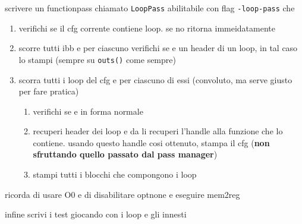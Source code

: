 scrivere un functionpass chiamato \lstinline|LoopPass| abilitabile con flag \lstinline|-loop-pass| che
\begin{enumerate}
  \item verifichi se il cfg corrente contiene loop. se no ritorna immeidatamente
  \item scorre tutti  ibb e per ciascuno verifichi se e un header di un loop, in tal caso lo stampi (sempre su \lstinline|outs()| come sempre)
  \item scorra tutti i loop del cfg e per ciascuno di essi (convoluto, ma serve giusto per fare pratica)
  \begin{enumerate}
    \item verifichi se e in forma normale
    \item recuperi header dei loop e da li recuperi l'handle alla funzione che lo contiene. usando questo handle cosi ottenuto, stampa il cfg (\textbf{non sfruttando quello passato dal pass manager})
    \item stampi tutti i blocchi che compongono i loop
  \end{enumerate}
\end{enumerate}

\begin{emphasize-blue}
    ricorda di usare O0 e di disabilitare optnone e eseguire mem2reg
\end{emphasize-blue}

infine scrivi i test giocando con i loop e gli innesti



